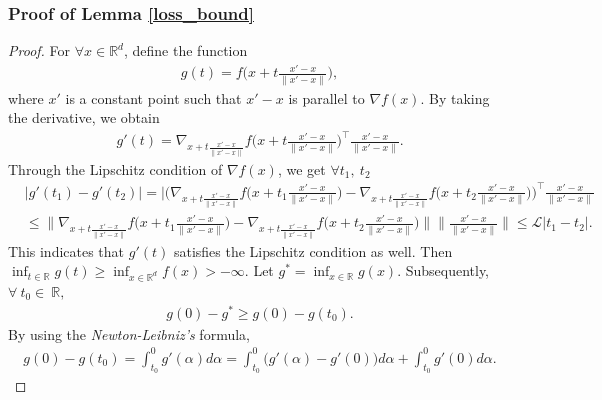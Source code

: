 \documentclass{article} %
\begin{document}
\subsubsection{Proof of Lemma \ref{loss_bound}}
\begin{proof}
	{For $\forall x\in \mathbb{R}^{d}$,	define the function
	\begin{equation}\nonumber
	\begin{aligned}
	g(t)=f\bigg(x+t\frac{x'-x}{\|x'-x\|}\bigg),
	\end{aligned}
	\end{equation}where $x'$ is a constant point such that   $x'-x$ is parallel to $\nabla f(x)$. By taking the derivative, we obtain
	\begin{equation}\label{qcxzd}
	\begin{aligned}
	g'(t)=\nabla_{x+t\frac{x'-x}{\|x'-x\|}}f\bigg(x+t\frac{x'-x}{\|x'-x\|}\bigg)^{\top}\frac{x'-x}{\|x'-x\|}.
	\end{aligned}
	\end{equation}Through the Lipschitz condition of $\nabla f(x)$, we get $\forall t_{1}, \ t_{2}$
	\begin{equation}\nonumber
	\begin{aligned}
	&\big|g'(t_{1})-g'(t_{2})\big|=\Bigg|\Bigg(\nabla_{x+t\frac{x'-x}{\|x'-x\|}}f\bigg(x+t_{1}\frac{x'-x}{\|x'-x\|}\bigg)-\nabla_{x+t\frac{x'-x}{\|x'-x\|}}f\bigg(x+t_{2}\frac{x'-x}{\|x'-x\|}\bigg)\Bigg)^{\top}\frac{x'-x}{\|x'-x\|}\\&\le\Bigg\|\nabla_{x+t\frac{x'-x}{\|x'-x\|}}f\bigg(x+t_{1}\frac{x'-x}{\|x'-x\|}\bigg)-\nabla_{x+t\frac{x'-x}{\|x'-x\|}}f\bigg(x+t_{2}\frac{x'-x}{\|x'-x\|}\bigg)\Bigg\|\bigg\|\frac{x'-x}{\|x'-x\|}\bigg\|\le \mathcal{L} |t_{1}-t_{2}|.
	\end{aligned}
	\end{equation}
 This indicates that $g'(t)$ satisfies the Lipschitz condition as well. Then $\inf_{t\in \mathbb{R}}g(t)\geq\inf_{x\in\mathbb{R}^{d}}f(x)>-\infty$. Let $g^{*}=\inf_{x\in{\mathbb{R}}}g(x)$. Subsequently, $\forall \ t_{0}\in \ \mathbb{R},$
	\begin{equation}\label{qwcdfs}
	\begin{aligned}
	g(0)-g^{*}\geq g(0)-g(t_{0}).
	\end{aligned}
	\end{equation}By using the \emph{Newton-Leibniz's} formula, 
	\begin{equation}\nonumber
	\begin{aligned}
	g(0)-g(t_{0})=\int_{t_{0}}^{0}g'(\alpha)d\alpha=\int_{t_{0}}^{0}\big(g'(\alpha)-g'(0)\big)d\alpha+\int_{t_{0}}^{0}g'(0)d\alpha.

\end{aligned}
\end{equation}}
\end{proof}
\end{document}
